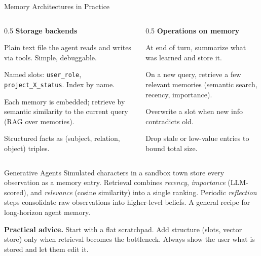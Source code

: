 \begin{frame}{Memory Architectures in Practice}

  \begin{columns}[T]
    \begin{column}{0.5\textwidth}
      \textbf{Storage backends}
      \begin{description}[style=nextline]
        \item[Scratchpad / file] Plain text file the agent reads and writes via tools. Simple, debuggable.
        \item[Key-value store] Named slots: \texttt{user\_role}, \texttt{project\_X\_status}. Index by name.
        \item[Vector store] Each memory is embedded; retrieve by semantic similarity to the current query (RAG over memories).
        \item[Knowledge graph] Structured facts as (subject, relation, object) triples.
      \end{description}
    \end{column}
    \begin{column}{0.5\textwidth}
      \textbf{Operations on memory}
      \begin{description}[style=nextline]
        \item[Write] At end of turn, summarize what was learned and store it.
        \item[Read] On a new query, retrieve a few relevant memories (semantic search, recency, importance).
        \item[Update] Overwrite a slot when new info contradicts old.
        \item[Forget] Drop stale or low-value entries to bound total size.
      \end{description}
    \end{column}
  \end{columns}

  \vspace{0.4em}
  \begin{block}{Generative Agents \cite{park2023generativeagents}}
    Simulated characters in a sandbox town store every observation as a memory entry.
    Retrieval combines \emph{recency}, \emph{importance} (LLM-scored), and
    \emph{relevance} (cosine similarity) into a single ranking.
    Periodic \emph{reflection} steps consolidate raw observations into higher-level beliefs.
    A general recipe for long-horizon agent memory.
  \end{block}

  \vspace{0.3em}
  \textbf{Practical advice.} Start with a flat scratchpad. Add structure (slots,
  vector store) only when retrieval becomes the bottleneck. Always show the user
  what is stored and let them edit it.
\end{frame}

